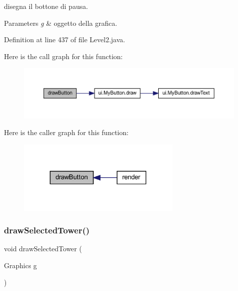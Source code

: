 disegna il bottone di pausa. 


\begin{DoxyParams}{Parameters}
{\em g} & oggetto della grafica. \\
\hline
\end{DoxyParams}


Definition at line 437 of file Level2.\+java.

Here is the call graph for this function\+:\nopagebreak
\begin{figure}[H]
\begin{center}
\leavevmode
\includegraphics[width=350pt]{classscenes_1_1_level2_a65768678909bc0512c6cb9780709ad38_cgraph}
\end{center}
\end{figure}
Here is the caller graph for this function\+:\nopagebreak
\begin{figure}[H]
\begin{center}
\leavevmode
\includegraphics[width=225pt]{classscenes_1_1_level2_a65768678909bc0512c6cb9780709ad38_icgraph}
\end{center}
\end{figure}
\mbox{\label{classscenes_1_1_level2_a0a97d0bb6d32640b2ae351707946abf7}} 
\subsubsection{\texorpdfstring{draw\+Selected\+Tower()}{drawSelectedTower()}}
{\footnotesize\ttfamily void draw\+Selected\+Tower (\begin{DoxyParamCaption}\item[{Graphics}]{g }\end{DoxyParamCaption})\hspace{0.3cm}{\ttfamily [private]}}



